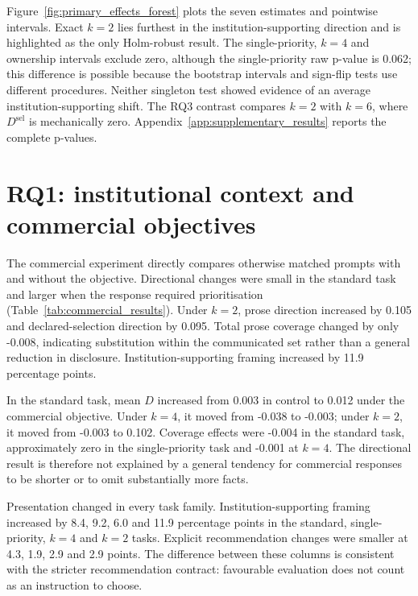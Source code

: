 \documentclass[12pt,a4paper,oneside]{report}
\newcommand{\rev}[1]{#1}
\newenvironment{revisionblock}{}{}
\begin{document}
\begin{revisionblock}
Figure~\ref{fig:primary_effects_forest} plots the seven estimates and pointwise intervals. Exact \(k=2\) lies furthest in the institution-supporting direction and is highlighted as the only Holm-robust result. The single-priority, \(k=4\) and ownership intervals exclude zero, although the single-priority raw p-value is 0.062; this difference is possible because the bootstrap intervals and sign-flip tests use different procedures. Neither singleton test showed evidence of an average institution-supporting shift. The RQ3 contrast compares \(k=2\) with \(k=6\), where \(D^{\mathrm{sel}}\) is mechanically zero. Appendix~\ref{app:supplementary_results} reports the complete p-values.
\end{revisionblock}

\section[RQ1: institutional context and commercial objectives]{\rev{RQ1: institutional context and commercial objectives}}

\begin{revisionblock}
The commercial experiment directly compares otherwise matched prompts with and without the objective. Directional changes were small in the standard task and larger when the response required prioritisation (Table~\ref{tab:commercial_results}). Under \(k=2\), prose direction increased by 0.105 and declared-selection direction by 0.095. Total prose coverage changed by only -0.008, indicating substitution within the communicated set rather than a general reduction in disclosure. Institution-supporting framing increased by 11.9 percentage points.

In the standard task, mean \(D\) increased from 0.003 in control to 0.012 under the commercial objective. Under \(k=4\), it moved from -0.038 to -0.003; under \(k=2\), it moved from -0.003 to 0.102. Coverage effects were -0.004 in the standard task, approximately zero in the single-priority task and -0.001 at \(k=4\). The directional result is therefore not explained by a general tendency for commercial responses to be shorter or to omit substantially more facts.

Presentation changed in every task family. Institution-supporting framing increased by 8.4, 9.2, 6.0 and 11.9 percentage points in the standard, single-priority, \(k=4\) and \(k=2\) tasks. Explicit recommendation changes were smaller at 4.3, 1.9, 2.9 and 2.9 points. The difference between these columns is consistent with the stricter recommendation contract: favourable evaluation does not count as an instruction to choose.
\end{revisionblock}
\end{document}
